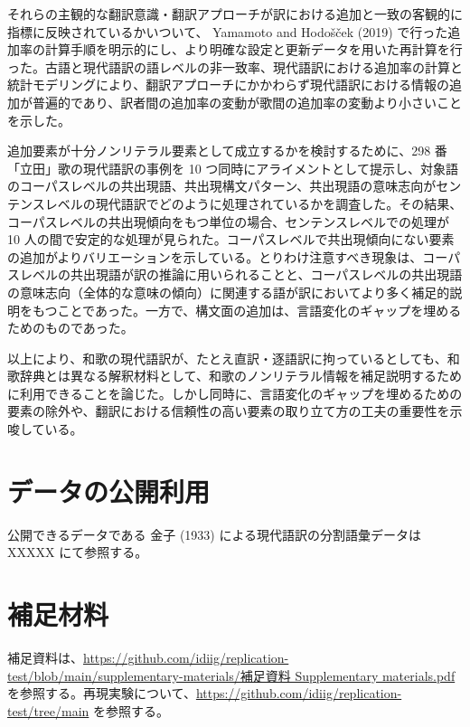 \documentclass[
  letterpaper,
  DIV=11,
  numbers=noendperiod]{scrartcl}
\begin{document}
それらの主観的な翻訳意識・翻訳アプローチが訳における追加と一致の客観的に指標に反映されているかいついて、
Yamamoto and Hodošček (2019)
で行った追加率の計算手順を明示的にし、より明確な設定と更新データを用いた再計算を行った。古語と現代語訳の語レベルの非一致率、現代語訳における追加率の計算と統計モデリングにより、翻訳アプローチにかかわらず現代語訳における情報の追加が普遍的であり、訳者間の追加率の変動が歌間の追加率の変動より小さいことを示した。

追加要素が十分ノンリテラル要素として成立するかを検討するために、298
番「立田」歌の現代語訳の事例を 10
つ同時にアライメントとして提示し、対象語のコーパスレベルの共出現語、共出現構文パターン、共出現語の意味志向がセンテンスレベルの現代語訳でどのように処理されているかを調査した。その結果、コーパスレベルの共出現傾向をもつ単位の場合、センテンスレベルでの処理が
10
人の間で安定的な処理が見られた。コーパスレベルで共出現傾向にない要素の追加がよりバリエーションを示している。とりわけ注意すべき現象は、コーパスレベルの共出現語が訳の推論に用いられることと、コーパスレベルの共出現語の意味志向（全体的な意味の傾向）に関連する語が訳においてより多く補足的説明をもつことであった。一方で、構文面の追加は、言語変化のギャップを埋めるためのものであった。

以上により、和歌の現代語訳が、たとえ直訳・逐語訳に拘っているとしても、和歌辞典とは異なる解釈材料として、和歌のノンリテラル情報を補足説明するために利用できることを論じた。しかし同時に、言語変化のギャップを埋めるための要素の除外や、翻訳における信頼性の高い要素の取り立て方の工夫の重要性を示唆している。

\section*{データの公開利用}\label{ux30c7ux30fcux30bfux306eux516cux958bux5229ux7528}

公開できるデータである 金子 (1933) による現代語訳の分割語彙データは
XXXXX にて参照する。

\section*{補足材料}\label{ux88dcux8db3ux6750ux6599}

補足資料は、\href{https://github.com/idiig/replication-test/blob/main/supplementary-materials/補足資料\%20Supplementary\%20materials.pdf}{https://github.com/idiig/replication-test/blob/main/supplementary-materials/補足資料
Supplementary materials.pdf}
を参照する。再現実験について、\url{https://github.com/idiig/replication-test/tree/main}
を参照する。
\end{document}
